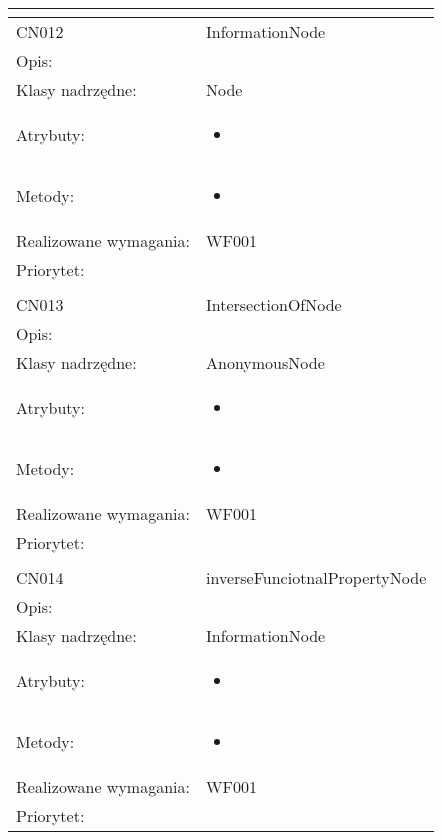 \documentclass[a4paper,10pt]{article}
\begin{document}
\begin{center}
\begin{tabular}{|m{3cm}|m{9cm}|}
\multicolumn{2}{c}{} \\
 \hline

CN012 & InformationNode \\ \hline
Opis: &     \\ \hline
Klasy nadrzędne: & Node     \\ \hline
Atrybuty: & \begin{itemize}
 \item 
\end{itemize}
 \\ \hline
Metody: & \begin{itemize}
 \item 
\end{itemize}
  \\ \hline
Realizowane wymagania: & WF001 \\ \hline
Priorytet: &  \\ \hline

\multicolumn{2}{c}{} \\
 \hline

CN013 & IntersectionOfNode \\ \hline
Opis: &     \\ \hline
Klasy nadrzędne: & AnonymousNode     \\ \hline
Atrybuty: & \begin{itemize}
 \item 
\end{itemize}
 \\ \hline
Metody: & \begin{itemize}
 \item 
\end{itemize}
  \\ \hline
Realizowane wymagania: & WF001 \\ \hline
Priorytet: &  \\ \hline

\multicolumn{2}{c}{} \\
 \hline

CN014 & inverseFunciotnalPropertyNode \\ \hline
Opis: &     \\ \hline
Klasy nadrzędne: & InformationNode     \\ \hline
Atrybuty: & \begin{itemize}
 \item 
\end{itemize}
 \\ \hline
Metody: & \begin{itemize}
 \item 
\end{itemize}
  \\ \hline
Realizowane wymagania: & WF001 \\ \hline
Priorytet: &  \\ \hline


\end{tabular}
\end{center}
\end{document}
